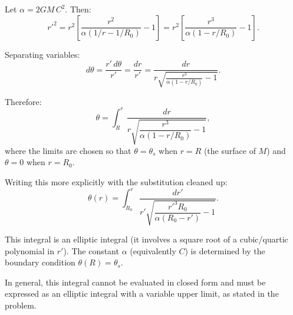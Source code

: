 \documentclass[12pt]{article}
\begin{document}
Let $\alpha = 2GM\,C^2$. Then:
\[
  r'^2 = r^2\left[\frac{r^2}{\alpha(1/r - 1/R_0)} - 1\right]
  = r^2\left[\frac{r^3}{\alpha(1 - r/R_0)} - 1\right].
\]

Separating variables:
\[
  d\theta = \frac{r'\,d\theta}{r'} = \frac{dr}{r'} = \frac{dr}{r\sqrt{\frac{r^3}{\alpha(1-r/R_0)} - 1}}.
\]

Therefore:
\[
  \theta = \int_{R}^{r} \frac{dr}{r\sqrt{\dfrac{r^3}{\alpha(1-r/R_0)} - 1}},
\]
where the limits are chosen so that $\theta = \theta_s$ when $r = R$ (the surface of $M$) and $\theta = 0$ when $r = R_0$.

Writing this more explicitly with the substitution cleaned up:
\[
  \theta(r) = \int_{R_0}^{r} \frac{dr'}{r'\sqrt{\dfrac{r'^3 R_0}{\alpha(R_0 - r')} - 1}}.
\]

This integral is an elliptic integral (it involves a square root of a cubic/quartic polynomial in $r'$). The constant $\alpha$ (equivalently $C$) is determined by the boundary condition $\theta(R) = \theta_s$.

In general, this integral cannot be evaluated in closed form and must be expressed as an elliptic integral with a variable upper limit, as stated in the problem.
\end{document}
